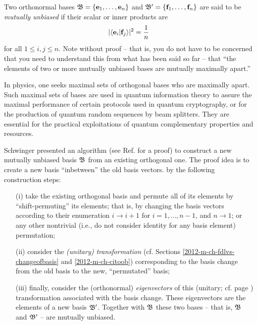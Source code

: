 Two  orthonormal bases
${\frak B} =\{
{\bf e}_1,
\ldots ,
{\bf e}_n
\}$
and
${\frak B}'=\{
{\bf f}_1,
\ldots ,
{\bf f}_n
\}$
are said to be {\em mutually unbiased}
if
their scalar or inner products are
\begin{equation}
\vert \langle {\bf e}_i\vert {\bf f}_j  \rangle \vert^2
=
\frac{1}{n}
\end{equation}
for all $1\le i,j\le n$.
Note without proof -- that is, you do not have to be concerned
that you need to understand  this from what has been said so far --
that ``the elements of two or more mutually unbiased bases are mutually maximally apart.''

{\color{Purple}
In physics, one seeks maximal sets of orthogonal bases who
are maximally apart.\cite{WooFie,durt}
Such maximal sets of bases are used in quantum information theory
to assure the maximal performance of certain protocols
used in quantum cryptography, or for the production of
quantum random sequences by beam splitters.
They are essential for the practical exploitations of quantum complementary properties
and resources.
}



Schwinger presented an algorithm (see Ref.\cite{Schwinger.60} for a proof)
to construct a new mutually unbiased basis ${\frak B}$   from an existing orthogonal one.
The proof idea
is to create a new basis ``inbetween'' the old basis vectors.
by the following construction steps:
\begin{itemize}
\item[(i)]
take the existing orthogonal basis and permute all of its elements by ``shift-permuting'' its elements; that is, by
changing
the basis vectors according to their enumeration $i \rightarrow i+1$ for $i=1,\ldots , n-1$, and $n \rightarrow 1$;
or any other nontrivial (i.e., do not consider identity for any basis element) permutation;
\item[(ii)]
consider the {\em (unitary) transformation} (cf. Sections \ref{2012-m-ch-fdlvs-changeofbasis} and \ref{2012-m-ch-citoob})
corresponding to the basis change from the old basis to the new, ``permutated'' basis;
\item[(iii)]
finally, consider the (orthonormal) {\em eigenvectors} 
of this (unitary; cf. page
\pageref{2014-m-ch-fdvs-unitary}) transformation associated with the basis change.
These eigenvectors are the elements of a new basis  ${\frak B}'$.
Together with ${\frak B}$ these two bases
-- that is, ${\frak B}$ and ${\frak B}'$ --  are mutually unbiased.
\end{itemize}

